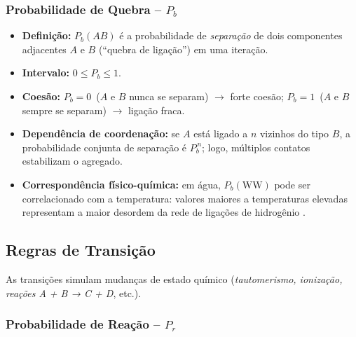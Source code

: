 \documentclass[12pt,oneside]{report}
\begin{document}
\subsubsection{Probabilidade de Quebra – \texorpdfstring{$P_b$}{Pb}}
\label{subsubsec:Pb}

\begin{itemize}
    \item \textbf{Definição:} $P_b(AB)$ é a probabilidade de
          \emph{separação} de dois componentes adjacentes $A$ e $B$
          (``quebra de ligação'') em uma iteração.
    \item \textbf{Intervalo:} $0 \le P_b \le 1$.
    \item \textbf{Coesão:} $P_b=0$ \,($A$ e $B$ nunca se separam)
          $\rightarrow$ forte coesão;
          $P_b=1$ \,($A$ e $B$ sempre se separam) $\rightarrow$ ligação fraca.
    \item \textbf{Dependência de coordenação:} se $A$ está ligado a
          $n$ vizinhos do tipo $B$, a probabilidade conjunta de separação é
          $P_b^{\,n}$; logo, múltiplos contatos estabilizam o agregado.
    \item \textbf{Correspondência físico-química:}
          em água, $P_b(\mathrm{WW})$ pode ser correlacionado com a temperatura:
          valores maiores a temperaturas elevadas representam a maior
          desordem da rede de ligações de hidrogênio \cite{kier2005}.
\end{itemize}

\subsection{Regras de Transição}
\label{subsec:trans_rules}

As transições simulam mudanças de estado químico
(\textit{tautomerismo, ionização, reações A + B → C + D}, etc.).

\subsubsection{Probabilidade de Reação – \texorpdfstring{$P_r$}{Pr}}
\label{subsubsec:Pr}
\end{document}
